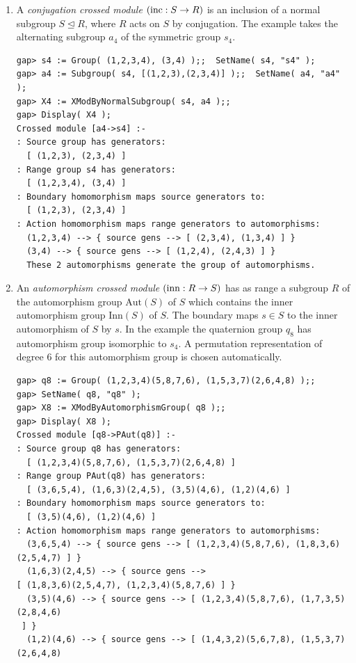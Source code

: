 \begin{enumerate}
\item A \emph{conjugation crossed module} $(\mathrm{inc} : S \to R)$ 
      is an inclusion of a normal subgroup  $S \unlhd R$,
      where $R$ acts on $S$ by conjugation. 
      The example takes the alternating subgroup $a_4$ 
      of the symmetric group $s_4$. 
{\small 
\begin{verbatim} 
gap> s4 := Group( (1,2,3,4), (3,4) );;  SetName( s4, "s4" ); 
gap> a4 := Subgroup( s4, [(1,2,3),(2,3,4)] );;  SetName( a4, "a4" ); 
gap> X4 := XModByNormalSubgroup( s4, a4 );; 
gap> Display( X4 );
Crossed module [a4->s4] :- 
: Source group has generators:
  [ (1,2,3), (2,3,4) ]
: Range group s4 has generators:
  [ (1,2,3,4), (3,4) ]
: Boundary homomorphism maps source generators to:
  [ (1,2,3), (2,3,4) ]
: Action homomorphism maps range generators to automorphisms:
  (1,2,3,4) --> { source gens --> [ (2,3,4), (1,3,4) ] }
  (3,4) --> { source gens --> [ (1,2,4), (2,4,3) ] }
  These 2 automorphisms generate the group of automorphisms.
\end{verbatim}}
\item An \emph{automorphism crossed module} $(\mathrm{inn} : R \to S)$ 
      has as range a subgroup $R$
      of the automorphism group  $\mbox{Aut}(S)$  of  $S$  which
      contains the inner automorphism group  $\mbox{Inn}(S)$  of  $S$.
      The boundary maps $s \in S$  to the inner automorphism of $S$ by $s$. 
      In the example the quaternion group $q_8$ has automorphism group 
      isomorphic to $s_4$.  A permutation representation of degree $6$ 
      for this automorphism group is chosen automatically. 
{\small 
\begin{verbatim}
gap> q8 := Group( (1,2,3,4)(5,8,7,6), (1,5,3,7)(2,6,4,8) );; 
gap> SetName( q8, "q8" ); 
gap> X8 := XModByAutomorphismGroup( q8 );; 
gap> Display( X8 );
Crossed module [q8->PAut(q8)] :- 
: Source group q8 has generators:
  [ (1,2,3,4)(5,8,7,6), (1,5,3,7)(2,6,4,8) ]
: Range group PAut(q8) has generators:
  [ (3,6,5,4), (1,6,3)(2,4,5), (3,5)(4,6), (1,2)(4,6) ]
: Boundary homomorphism maps source generators to:
  [ (3,5)(4,6), (1,2)(4,6) ]
: Action homomorphism maps range generators to automorphisms:
  (3,6,5,4) --> { source gens --> [ (1,2,3,4)(5,8,7,6), (1,8,3,6)(2,5,4,7) ] }
  (1,6,3)(2,4,5) --> { source gens --> 
[ (1,8,3,6)(2,5,4,7), (1,2,3,4)(5,8,7,6) ] }
  (3,5)(4,6) --> { source gens --> [ (1,2,3,4)(5,8,7,6), (1,7,3,5)(2,8,4,6) 
 ] }
  (1,2)(4,6) --> { source gens --> [ (1,4,3,2)(5,6,7,8), (1,5,3,7)(2,6,4,8) 

\end{verbatim}}
\end{enumerate}
